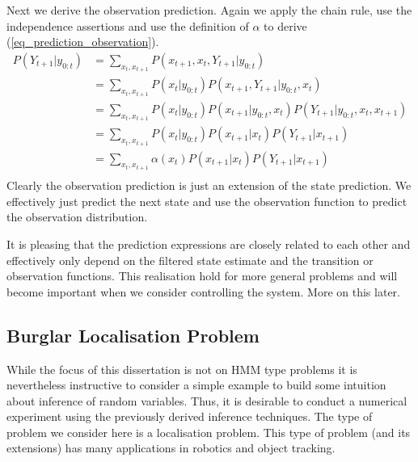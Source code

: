 Next we derive the observation prediction. Again we apply the chain rule, use the independence assertions and use the definition of $\alpha$ to derive (\ref{eq_prediction_observation}).
\begin{equation}
\begin{aligned}
P(Y_{t+1}|y_{0:t}) &= \sum_{x_t, x_{t+1}} P(x_{t+1}, x_t, Y_{t+1}|y_{0:t})\\
&= \sum_{x_t, x_{t+1}} P(x_t|y_{0:t})P(x_{t+1}, Y_{t+1}|y_{0:t}, x_t) \\
&= \sum_{x_t, x_{t+1}} P(x_t|y_{0:t})P(x_{t+1}|y_{0:t}, x_t)P(Y_{t+1}|y_{0:t}, x_t, x_{t+1}) \\
&= \sum_{x_t, x_{t+1}} P(x_t|y_{0:t})P(x_{t+1}|x_t)P(Y_{t+1}|x_{t+1}) \\
&= \sum_{x_t, x_{t+1}} \alpha(x_t)P(x_{t+1}|x_t)P(Y_{t+1}|x_{t+1}) \\
\end{aligned}
\label{eq_prediction_observation}
\end{equation}
Clearly the observation prediction is just an extension of the state prediction. We effectively just predict the next state and use the observation function to predict the observation distribution.

It is pleasing that the prediction expressions are closely related to each other and effectively only depend on the filtered state estimate and the transition or observation functions. This realisation hold for more general problems and will become important when we consider controlling the system. More on this later.

\subsection{Burglar Localisation Problem}
While the focus of this dissertation is not on HMM type problems it is nevertheless instructive to consider a simple example to build some intuition about inference of random variables. Thus, it is desirable to conduct a numerical experiment using the previously derived inference techniques. The type of problem we consider here is a localisation problem. This type of problem (and its extensions) has many applications in robotics and object tracking.


